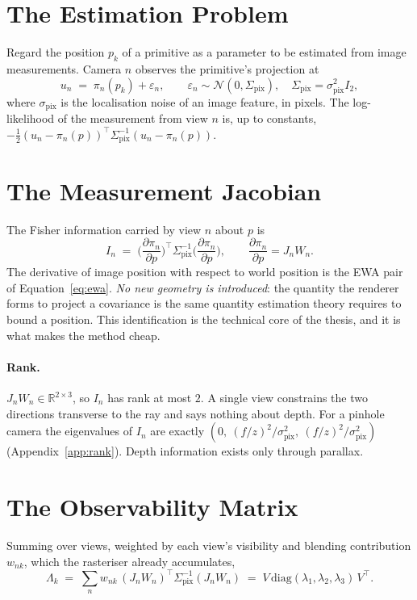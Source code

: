 \section{The Estimation Problem}
Regard the position $p_k$ of a primitive as a parameter to be estimated from
image measurements. Camera $n$ observes the primitive's projection at
\begin{equation}
  u_n \;=\; \pi_n(p_k) + \varepsilon_n,\qquad
  \varepsilon_n \sim \mathcal{N}(0,\Sigma_{\mathrm{pix}}),\quad
  \Sigma_{\mathrm{pix}} = \sigma_{\mathrm{pix}}^2 I_2 ,
  \label{eq:measurement}
\end{equation}
where $\sigma_{\mathrm{pix}}$ is the localisation noise of an image feature, in
pixels. The log-likelihood of the measurement from view $n$ is, up to constants,
$-\tfrac12 (u_n-\pi_n(p))^{\!\top}\Sigma_{\mathrm{pix}}^{-1}(u_n-\pi_n(p))$.

\section{The Measurement Jacobian}
\label{sec:jacobian}
The Fisher information carried by view $n$ about $p$ is
\begin{equation}
  I_n \;=\; \Big(\frac{\partial \pi_n}{\partial p}\Big)^{\!\top}
            \Sigma_{\mathrm{pix}}^{-1}
            \Big(\frac{\partial \pi_n}{\partial p}\Big),
  \qquad \frac{\partial \pi_n}{\partial p} = J_n W_n .
  \label{eq:fisher-view}
\end{equation}
The derivative of image position with respect to world position is the EWA pair
of Equation~\eqref{eq:ewa}. \emph{No new geometry is introduced}: the quantity
the renderer forms to project a covariance is the same quantity estimation
theory requires to bound a position. This identification is the technical core
of the thesis, and it is what makes the method cheap.

\paragraph{Rank.} $J_nW_n \in \mathbb{R}^{2\times3}$, so $I_n$ has rank at most
$2$. A single view constrains the two directions transverse to the ray and says
nothing about depth. For a pinhole camera the eigenvalues of $I_n$ are exactly
$(0,\ (f/z)^2/\sigma_{\mathrm{pix}}^2,\ (f/z)^2/\sigma_{\mathrm{pix}}^2)$
(Appendix~\ref{app:rank}). Depth information exists only through parallax.

\section{The Observability Matrix}
\label{sec:accumulation}
Summing over views, weighted by each view's visibility and blending contribution $w_{nk}$, which the rasteriser already accumulates,
\begin{equation}
  \Lambda_k \;=\; \sum_n w_{nk}\,(J_nW_n)^{\!\top}\Sigma_{\mathrm{pix}}^{-1}(J_nW_n)
  \;=\; V\,\mathrm{diag}(\lambda_1,\lambda_2,\lambda_3)\,V^{\!\top}.
  \label{eq:lambda}
\end{equation}

